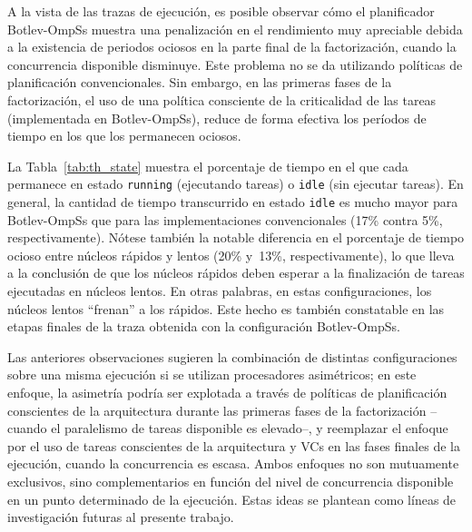 A la vista de las trazas de ejecución, es posible observar cómo el planificador Botlev-OmpSs muestra una penalización
en el rendimiento muy apreciable debida a la existencia de periodos ociosos en la parte final de la factorización, cuando
la concurrencia disponible disminuye. Este problema no se da utilizando políticas de planificación convencionales. Sin embargo,
en las primeras fases de la factorización, el uso de una política consciente de la criticalidad de las tareas (implementada en 
Botlev-OmpSs), reduce de forma efectiva los períodos de tiempo en los que los \wts permanecen ociosos.

La Tabla~\ref{tab:th_state} muestra el porcentaje de tiempo en el que cada \wt permanece en estado 
{\tt running} (ejecutando tareas) o {\tt idle} (sin ejecutar tareas). En general, la cantidad de tiempo transcurrido en estado
{\tt idle} es mucho mayor para Botlev-OmpSs que para las implementaciones convencionales
(17\% contra 5\%, respectivamente). 
Nótese también la notable diferencia en el porcentaje de tiempo ocioso entre núcleos rápidos y lentos
(20\% y~13\%, respectivamente), lo que lleva a la conclusión de que los núcleos rápidos deben esperar 
a la finalización de tareas ejecutadas en núcleos lentos. En otras palabras, en estas configuraciones, los núcleos lentos ``frenan'' a los
rápidos. Este hecho es también constatable en las etapas finales de la traza obtenida con la configuración Botlev-OmpSs.

Las anteriores observaciones sugieren la combinación de distintas configuraciones sobre una misma ejecución si
se utilizan procesadores asimétricos; en este enfoque, la asimetría podría ser explotada a través de políticas de planificación
conscientes de la arquitectura durante las primeras fases de la factorización --cuando el paralelismo de tareas disponible es elevado--,
y reemplazar el enfoque por el uso de tareas conscientes de la arquitectura y VCs en las fases finales de la ejecución, cuando la
concurrencia es escasa. Ambos enfoques no son mutuamente exclusivos, sino complementarios en función del nivel de concurrencia disponible
en un punto determinado de la ejecución. Estas ideas se plantean como líneas de investigación futuras al presente trabajo.

